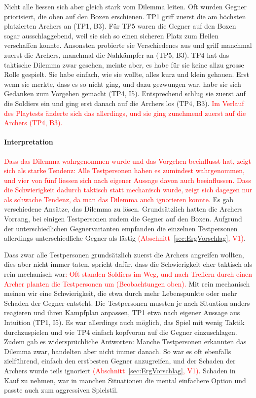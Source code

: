 \documentclass[../Main.tex]{subfiles}
\begin{document}
Nicht alle liessen sich aber gleich stark vom Dilemma leiten. Oft wurden Gegner priorisiert, die oben auf den Boxen erschienen. TP1 griff zuerst die am höchsten platzierten Archers an (TP1, B3). Für TP5 waren die Gegner auf den Boxen sogar ausschlaggebend, weil sie sich so einen sicheren Platz zum Heilen verschaffen konnte. Ansonsten probierte sie Verschiedenes aus und griff manchmal zuerst die Archers, manchmal die Nahkämpfer an (TP5, B3). TP4 hat das taktische Dilemma zwar gesehen, meinte aber, es habe für sie keine allzu grosse Rolle gespielt. Sie habe einfach, wie sie wollte, alles kurz und klein gehauen. Erst wenn sie merkte, dass es so nicht ging, und dazu gezwungen war, habe sie sich Gedanken zum Vorgehen gemacht (TP4, I5). Entsprechend schlug sie zuerst auf die Soldiers ein und ging erst danach auf die Archers los (TP4, B3). \textcolor{red}{Im Verlauf des Playtests änderte sich das allerdings, und sie ging zunehmend zuerst auf die Archers (TP4, B3).}

\paragraph{Interpretation}
\textcolor{red}{Dass das Dilemma wahrgenommen wurde und das Vorgehen beeinflusst hat, zeigt sich als starke Tendenz: Alle Testpersonen haben es zumindest wahrgenommen, und vier von fünf liessen sich nach eigener Aussage davon auch beeinflussen. Dass die Schwierigkeit dadurch taktisch statt mechanisch wurde, zeigt sich dagegen nur als schwache Tendenz, da man das Dilemma auch ignorieren konnte.} Es gab verschiedene Ansätze, das Dilemma zu lösen. Grundsätzlich hatten die Archers Vorrang, bei einigen Testpersonen zudem die Gegner auf den Boxen. Aufgrund der unterschiedlichen Gegnervarianten empfanden die einzelnen Testpersonen allerdings unterschiedliche Gegner als lästig\textcolor{red}{ (Abschnitt~\ref{sec:ErgVorschlag}, V1)}.

Dass zwar alle Testpersonen grundsätzlich zuerst die Archers angreifen wollten, dies aber nicht immer taten, spricht dafür, dass die Schwierigkeit eher taktisch als rein mechanisch war\textcolor{red}{: Oft standen Soldiers im Weg, und nach Treffern durch einen Archer planten die Testpersonen um (Beobachtungen oben).} Mit rein mechanisch meinen wir eine Schwierigkeit, die etwa durch mehr Lebenspunkte oder mehr Schaden der Gegner entsteht. Die Testpersonen mussten je nach Situation anders reagieren und ihren Kampfplan anpassen, TP1 etwa nach eigener Aussage aus Intuition (TP1, I5). Es war allerdings auch möglich, das Spiel mit wenig Taktik durchzuspielen und wie TP4 einfach kopfvoran auf die Gegner einzuschlagen. Zudem gab es widersprüchliche Antworten: Manche Testpersonen erkannten das Dilemma zwar, handelten aber nicht immer danach. So war es oft ebenfalls zielführend, einfach den erstbesten Gegner anzugreifen, und der Schaden der Archers wurde teils ignoriert\textcolor{red}{ (Abschnitt~\ref{sec:ErgVorschlag}, V1)}. Schaden in Kauf zu nehmen, war in manchen Situationen die mental einfachere Option und passte auch zum aggressiven Spielstil.
\end{document}
